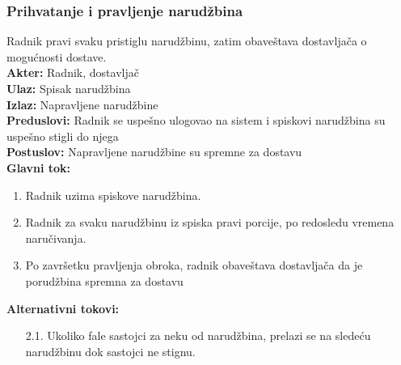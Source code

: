 \documentclass{article}
\begin{document}
\subsubsection{Prihvatanje i pravljenje narudžbina}
Radnik pravi svaku pristiglu narudžbinu, zatim obaveštava dostavljača o mogućnosti dostave.\\
\textbf{Akter:} Radnik, dostavljač\\
\textbf{Ulaz:} Spisak narudžbina\\
\textbf{Izlaz:} Napravljene narudžbine\\
\textbf{Preduslovi:} Radnik se uspešno ulogovao na sistem i spiskovi narudžbina su uspešno stigli do njega\\
\textbf{Postuslov:}  Napravljene narudžbine su spremne za dostavu\\
\textbf{Glavni tok:}
\begin{enumerate}
\item Radnik uzima spiskove narudžbina.
\item Radnik za svaku narudžbinu iz spiska pravi porcije, po redosledu vremena naručivanja.
\item Po završetku pravljenja obroka, radnik obaveštava dostavljača da je porudžbina spremna za dostavu 
\end{enumerate}
\textbf{Alternativni tokovi:}\\
\begin{itemize}
\item [2.1.] Ukoliko  fale sastojci za neku od narudžbina, prelazi se na sledeću narudžbinu dok sastojci ne stignu.
\end{itemize}
       
\end{document}
